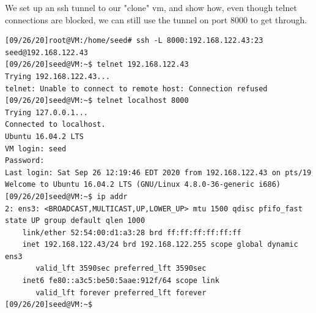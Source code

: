 \documentclass{article}
\begin{document}
We set up an ssh tunnel to our "clone" vm, and show how, even though telnet 
connections are blocked, we can still use the tunnel on port 8000 to get through.
\begin{verbatim}
[09/26/20]root@VM:/home/seed# ssh -L 8000:192.168.122.43:23  seed@192.168.122.43
[09/26/20]seed@VM:~$ telnet 192.168.122.43
Trying 192.168.122.43...
telnet: Unable to connect to remote host: Connection refused
[09/26/20]seed@VM:~$ telnet localhost 8000
Trying 127.0.0.1...
Connected to localhost.
Ubuntu 16.04.2 LTS
VM login: seed
Password:
Last login: Sat Sep 26 12:19:46 EDT 2020 from 192.168.122.43 on pts/19
Welcome to Ubuntu 16.04.2 LTS (GNU/Linux 4.8.0-36-generic i686)
[09/26/20]seed@VM:~$ ip addr
2: ens3: <BROADCAST,MULTICAST,UP,LOWER_UP> mtu 1500 qdisc pfifo_fast state UP group default qlen 1000
    link/ether 52:54:00:d1:a3:28 brd ff:ff:ff:ff:ff:ff
    inet 192.168.122.43/24 brd 192.168.122.255 scope global dynamic ens3
       valid_lft 3590sec preferred_lft 3590sec
    inet6 fe80::a3c5:be50:5aae:912f/64 scope link
       valid_lft forever preferred_lft forever
[09/26/20]seed@VM:~$
\end{verbatim}
\end{document}
